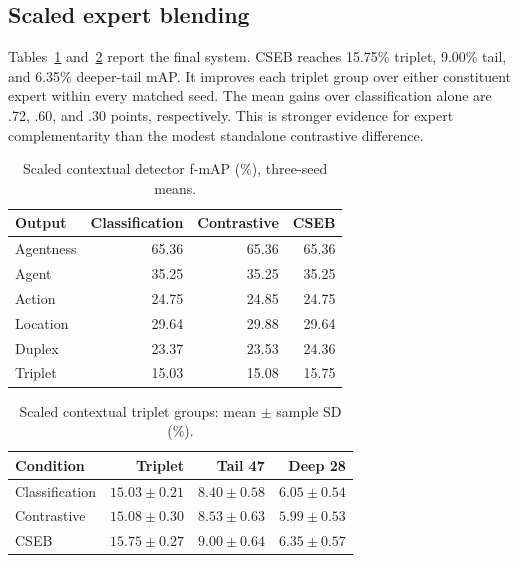 \documentclass[11pt,letterpaper]{article}
\begin{document}
\subsection{Scaled expert blending}
Tables~\ref{tab:scaled-all} and~\ref{tab:scaled-tail} report the final system. CSEB reaches 15.75\% triplet, 9.00\% tail, and 6.35\% deeper-tail mAP. It improves each triplet group over either constituent expert within every matched seed. The mean gains over classification alone are .72, .60, and .30 points, respectively. This is stronger evidence for expert complementarity than the modest standalone contrastive difference.
\begin{table}[htbp]
\centering
\caption{Scaled contextual detector f-mAP (\%), three-seed means.}
\label{tab:scaled-all}
\begin{singlespace}
\begin{tabular}{@{}lrrr@{}}
\toprule
\textbf{Output} & \textbf{Classification} & \textbf{Contrastive} & \textbf{CSEB} \\
\midrule
Agentness & 65.36 & 65.36 & 65.36 \\
Agent & 35.25 & 35.25 & 35.25 \\
Action & 24.75 & 24.85 & 24.75 \\
Location & 29.64 & 29.88 & 29.64 \\
Duplex & 23.37 & 23.53 & 24.36 \\
Triplet & 15.03 & 15.08 & 15.75 \\
\bottomrule
\end{tabular}
\end{singlespace}
\end{table}

\begin{table}[htbp]
\centering
\caption{Scaled contextual triplet groups: mean $\pm$ sample SD (\%).}
\label{tab:scaled-tail}
\begin{singlespace}
\begin{tabularx}{\textwidth}{@{}Xrrr@{}}
\toprule
\textbf{Condition} & \textbf{Triplet} & \textbf{Tail 47} & \textbf{Deep 28} \\
\midrule
Classification & $15.03\pm0.21$ & $8.40\pm0.58$ & $6.05\pm0.54$ \\
Contrastive & $15.08\pm0.30$ & $8.53\pm0.63$ & $5.99\pm0.53$ \\
CSEB & $15.75\pm0.27$ & $9.00\pm0.64$ & $6.35\pm0.57$ \\
\bottomrule
\end{tabularx}
\end{singlespace}
\end{table}
\end{document}
